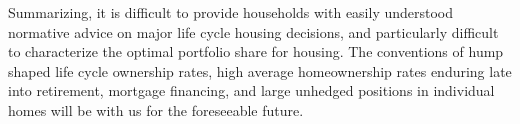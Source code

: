 \documentclass[12pt]{article}
\begin{document}
Summarizing, it is difficult to provide households with easily understood
normative advice on major life cycle housing decisions, and particularly
difficult to characterize the optimal portfolio share for housing. The
conventions of hump shaped life cycle ownership rates, high average
homeownership rates enduring late into retirement, mortgage financing, and
large unhedged positions in individual homes will be with us for the
foreseeable future.

\printbibliography
\end{document}
